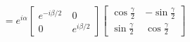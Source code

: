 \documentclass[preview]{standalone}
\begin{document}
\begin{align*}
= e^{i\alpha} \begin{bmatrix} e^{-i\beta/2}\
        & 0 \\[2mm] 0 & e^{i\beta/2} \end{bmatrix} \begin{bmatrix} \cos \frac{\gamma}{2}\
        & -\sin \frac{\gamma}{2} \\[2mm] \sin \frac{\gamma}{2} & \cos \frac{\gamma}{2} \end{bmatrix}
\end{align*}
\end{document}

